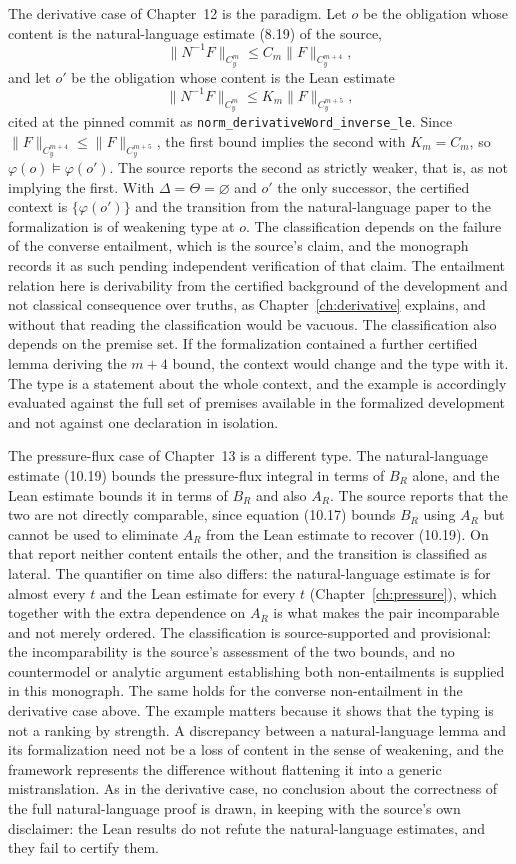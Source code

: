 The derivative case of Chapter~12 is the paradigm. Let $o$ be the obligation whose content is the natural-language estimate (8.19) of the source,
\[
\|N^{-1}F\|_{C^m_y} \le C_m \|F\|_{C^{m+4}_y},
\]
and let $o'$ be the obligation whose content is the Lean estimate
\[
\|N^{-1}F\|_{C^m_y} \le K_m \|F\|_{C^{m+5}_y},
\]
cited at the pinned commit as \texttt{norm\_derivativeWord\_inverse\_le}. Since $\|F\|_{C^{m+4}_y} \le \|F\|_{C^{m+5}_y}$, the first bound implies the second with $K_m = C_m$, so $\varphi(o) \models \varphi(o')$. The source reports the second as strictly weaker, that is, as not implying the first. With $\Delta = \Theta = \varnothing$ and $o'$ the only successor, the certified context is $\{\varphi(o')\}$ and the transition from the natural-language paper to the formalization is of weakening type at $o$. The classification depends on the failure of the converse entailment, which is the source's claim, and the monograph records it as such pending independent verification of that claim. The entailment relation here is derivability from the certified background of the development and not classical consequence over truths, as Chapter~\ref{ch:derivative} explains, and without that reading the classification would be vacuous. The classification also depends on the premise set. If the formalization contained a further certified lemma deriving the $m+4$ bound, the context would change and the type with it. The type is a statement about the whole context, and the example is accordingly evaluated against the full set of premises available in the formalized development and not against one declaration in isolation.

The pressure-flux case of Chapter~13 is a different type. The natural-language estimate (10.19) bounds the pressure-flux integral in terms of $B_R$ alone, and the Lean estimate bounds it in terms of $B_R$ and also $A_R$. The source reports that the two are not directly comparable, since equation (10.17) bounds $B_R$ using $A_R$ but cannot be used to eliminate $A_R$ from the Lean estimate to recover (10.19). On that report neither content entails the other, and the transition is classified as lateral. The quantifier on time also differs: the natural-language estimate is for almost every $t$ and the Lean estimate for every $t$ (Chapter~\ref{ch:pressure}), which together with the extra dependence on $A_R$ is what makes the pair incomparable and not merely ordered. The classification is source-supported and provisional: the incomparability is the source's assessment of the two bounds, and no countermodel or analytic argument establishing both non-entailments is supplied in this monograph. The same holds for the converse non-entailment in the derivative case above. The example matters because it shows that the typing is not a ranking by strength. A discrepancy between a natural-language lemma and its formalization need not be a loss of content in the sense of weakening, and the framework represents the difference without flattening it into a generic mistranslation. As in the derivative case, no conclusion about the correctness of the full natural-language proof is drawn, in keeping with the source's own disclaimer: the Lean results do not refute the natural-language estimates, and they fail to certify them.


